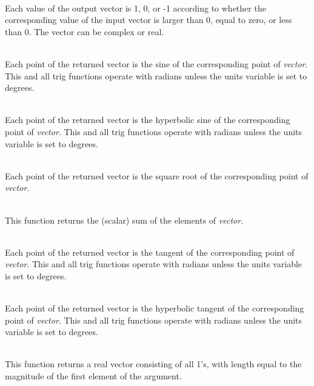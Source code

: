 \begin{description}
\item{}\\
Each value of the output vector is 1, 0, or -1 according to whether
the corresponding value of the input vector is larger than 0, equal to
zero, or less than 0.  The vector can be complex or real.

\item{}\\
Each point of the returned vector is the sine of the
corresponding point of {\it vector\/}.  This and all trig functions
operate with radians unless the {\et units} variable is set to {\vt
degrees}.

\item{}\\
Each point of the returned vector is the hyperbolic sine of the
corresponding point of {\it vector\/}.  This and all trig functions
operate with radians unless the {\et units} variable is set to {\vt
degrees}.

\item{}\\
Each point of the returned vector is the square root of the
corresponding point of {\it vector}.

\item{}\\
This function returns the (scalar) sum of the elements of {\it
vector}.

\item{}\\
Each point of the returned vector is the tangent of the
corresponding point of {\it vector\/}.  This and all trig functions
operate with radians unless the {\et units} variable is set to {\vt
degrees}.

\item{}\\
Each point of the returned vector is the hyperbolic tangent of the
corresponding point of {\it vector\/}.  This and all trig functions
operate with radians unless the {\et units} variable is set to {\vt
degrees}.

\item{}\\
This function returns a real vector consisting of all 1's, with length
equal to the magnitude of the first element of the argument.


\end{description}
